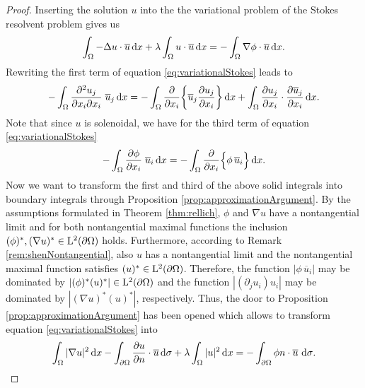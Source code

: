 \begin{proof}
  Inserting the solution $u$ into the the variational problem of the Stokes resolvent problem gives us
  \begin{align}
    \label{eq:variationalStokes}
    \int_\Omega -\Delta u \cdot \overline u \, {\operatorname{d}\!{x}} + \lambda \int_\Omega u \cdot \overline u \, {\operatorname{d}\!{x}}= - \int_\Omega \nabla \phi \cdot \overline u \, {\operatorname{d}\!{x}}.
  \end{align}
  Rewriting the first term of equation \eqref{eq:variationalStokes} leads to 
  \begin{align*}
    -\int_{\Omega} \frac{\partial^2 u_j}{\partial x_i \partial x_i}  \; \overline u_j \, {\operatorname{d}\!{x}}
    = -\int_{\Omega} \frac{\partial }{\partial x_i} \bigg\{ \overline u_j \frac{\partial u_j}{\partial x_i} \bigg\} \, {\operatorname{d}\!{x}} + \int_\Omega \frac{\partial u_j}{\partial x_i} \cdot \frac{\partial \overline u_j}{\partial x_i} \, {\operatorname{d}\!{x}}.
    \end{align*}
  Note that since $u$ is solenoidal, we have for the third term of equation \eqref{eq:variationalStokes}
  \begin{align*}
    - \int_{\Omega} \frac{\partial \phi}{\partial x_i} \; \overline u_i \, {\operatorname{d}\!{x}} = - \int_{\Omega} \frac{\partial}{\partial x_i} \Big\{ \phi\,  \overline u_i \Big\} \, {\operatorname{d}\!{x}}.
  \end{align*}
  Now we want to transform the first and third of the above solid integrals into boundary integrals through Proposition \ref{prop:approximationArgument}.
  By the assumptions formulated in Theorem \ref{thm:rellich}, $\phi$ and $\nabla u$ have a nontangential limit and for both nontangential maximal functions the inclusion $(\phi)^*, (\nabla u)^* \in \mathrm{L}^2(\partial\Omega)$ holds. 
  Furthermore, according to Remark \ref{rem:shenNontangential}, also $u$ has a nontangential limit and the nontangential maximal function satisfies $(u)^* \in \mathrm{L}^2(\partial\Omega)$. 
  Therefore, the function $|\phi\,  \overline u_i |$ may be dominated by $|(\phi)^* (u)^*| \in \mathrm{L}^2(\partial\Omega)$ and the function $|(\partial_j u_i) u_i|$ may be dominated by $|(\nabla u)^* (u)^*|$, respectively. Thus, the door to Proposition \ref{prop:approximationArgument} has been opened which allows to transform equation \eqref{eq:variationalStokes} into
  \begin{align*}
    \int_\Omega |\nabla u|^2 \, {\operatorname{d}\!{x}} - \int_{\partial\Omega} \frac{\partial u}{\partial n} \cdot \overline u \, {\operatorname{d}\!{\sigma}} + \lambda \int_\Omega |u|^2 \, {\operatorname{d}\!{x}} = - \int_{\partial\Omega}  \phi n \cdot \overline u \, \, {\operatorname{d}\!{\sigma}}.
  \end{align*}

\end{proof}
